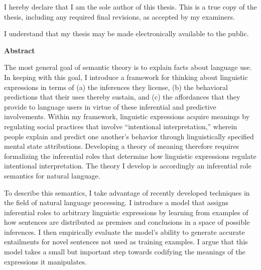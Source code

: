 \cleardoublepage %
 


  \noindent
I hereby declare that I am the sole author of this thesis. This is a true copy of the thesis, including any required final revisions, as accepted by my examiners.

  \bigskip
  
  \noindent
I understand that my thesis may be made electronically available to the public.

\cleardoublepage


\begin{center}\textbf{Abstract}\end{center}

The most general goal of semantic theory is to explain facts about language use. In keeping with this goal, I introduce a framework for thinking about linguistic expressions in terms of (a) the inferences they license, (b) the behavioral predictions that their uses thereby sustain, and (c) the affordances that they provide to language users in virtue of these inferential and predictive involvements. Within my framework, linguistic expressions acquire meanings by regulating social practices that involve ``intentional interpretation,'' wherein people explain and predict one another's behavior through linguistically specified mental state attributions. Developing a theory of meaning therefore requires formalizing the inferential roles that determine how linguistic expressions regulate intentional interpretation. The theory I develop is accordingly an inferential role semantics for natural language.

To describe this semantics, I take advantage of recently developed techniques in the field of natural language processing. I introduce a model that assigns inferential roles to arbitrary linguistic expressions by learning from examples of how sentences are distributed as premises and conclusions in a space of possible inferences. I then empirically evaluate the model's ability to generate accurate entailments for novel sentences not used as training examples. I argue that this model takes a small but important step towards codifying the meanings of the expressions it manipulates.

